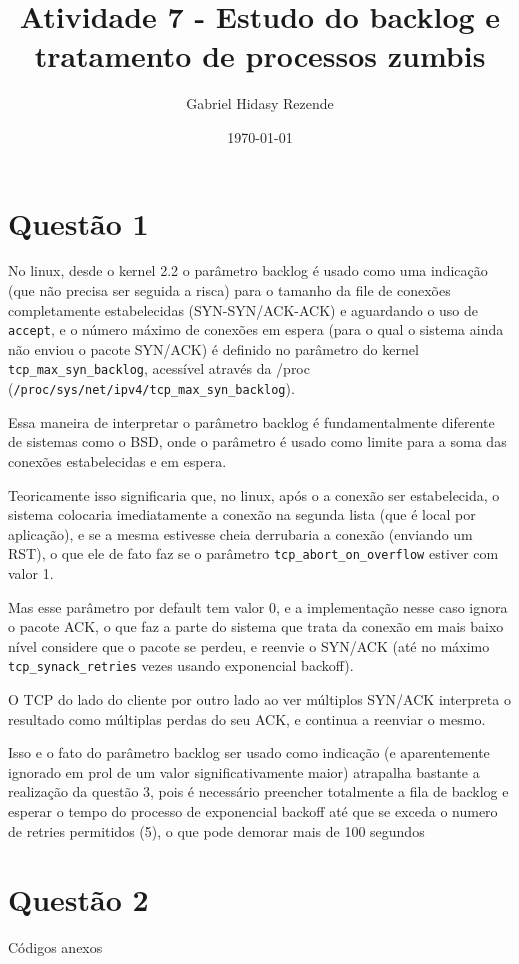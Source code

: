 \documentclass[11pt]{article}
\author{Gabriel Hidasy Rezende}
\date{\today}
\title{Atividade 7 - Estudo do backlog e tratamento de processos zumbis}
\begin{document}
\maketitle
\section{Questão 1}
\label{sec:orgheadline1}
No linux, desde o kernel 2.2 o parâmetro backlog é usado como uma indicação (que
não precisa ser seguida a risca) para o tamanho da file de conexões
completamente estabelecidas (SYN-SYN/ACK-ACK) e aguardando o uso de \texttt{accept}, e
o número máximo de conexões em espera (para o qual o sistema ainda não enviou o
pacote SYN/ACK) é definido no parâmetro do kernel \texttt{tcp\_max\_syn\_backlog},
acessível através da /proc \\(\texttt{/proc/sys/net/ipv4/tcp\_max\_syn\_backlog}).

Essa maneira de interpretar o parâmetro backlog é fundamentalmente diferente de
sistemas como o BSD, onde o parâmetro é usado como limite para a soma das
conexões estabelecidas e em espera.

Teoricamente isso significaria que, no linux, após o a conexão ser estabelecida,
o sistema  colocaria imediatamente a conexão na segunda lista (que é local por
aplicação), e se a mesma estivesse cheia derrubaria a conexão (enviando um RST),
o que ele de fato faz se o parâmetro \texttt{tcp\_abort\_on\_overflow} estiver com valor 1.

Mas esse parâmetro por default tem valor 0, e a implementação nesse caso ignora
o pacote ACK, o que faz a parte do sistema que trata da conexão em mais baixo
nível considere que o pacote se perdeu, e reenvie o SYN/ACK (até no máximo
\texttt{tcp\_synack\_retries} vezes usando exponencial backoff).

O TCP do lado do cliente por outro lado ao ver múltiplos SYN/ACK interpreta o
resultado como múltiplas perdas do seu ACK, e continua a reenviar o mesmo.

Isso e o fato do parâmetro backlog ser usado como indicação (e aparentemente
ignorado em prol de um valor significativamente maior) atrapalha bastante a
realização da questão 3, pois é necessário preencher totalmente a fila de
backlog e esperar o tempo do processo de exponencial backoff até que se exceda o
numero de retries permitidos (5), o que pode demorar mais de 100 segundos

\section{Questão 2}
\label{sec:orgheadline2}
Códigos anexos
\end{document}
